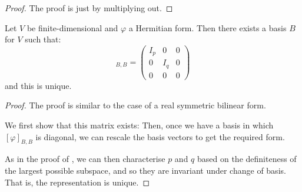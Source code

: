 \documentclass[../Main.tex]{subfiles}
\begin{document}
\begin{proof}
    The proof is just by multiplying out.
\end{proof}
\begin{theorem}
    Let $V$ be finite-dimensional and $\varphi$ a Hermitian form. Then there exists a basis $B$ for $V$ such that:
    \begin{equation*}
        [\varphi]_{B, B} =
        \begin{pmatrix}
            I_p & 0 & 0 \\
            0 & I_q & 0 \\
            0 & 0 & 0
        \end{pmatrix}
    \end{equation*}
    and this is unique.
    \label{thmSFNiceMatrix}
\end{theorem}
\begin{proof}
    The proof is similar to the case of a real symmetric bilinear form.

    We first show that this matrix exists:
    Then, once we have a basis in which $[\varphi]_{B, B}$ is diagonal, we can rescale the basis vectors to get the required form.

    As in the proof of , we can then characterise $p$ and $q$ based on the definiteness of the largest possible subspace, and so they are invariant under change of basis. That is, the representation is unique.
\end{proof}
\end{document}
